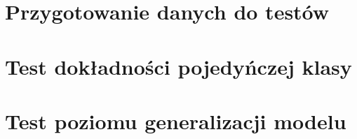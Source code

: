 \section{Przygotowanie danych do testów}
\label{sec:test-wspoldzielony}


\section{Test dokładności pojedyńczej klasy}
\label{sec:test-1}


\section{Test poziomu generalizacji modelu}
\label{sec:test-2}


